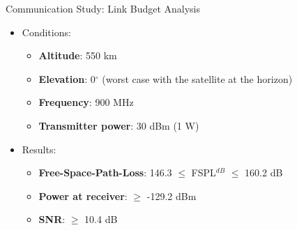 %
%

\begin{frame}{Communication Study: Link Budget Analysis}

    \begin{itemize}
        \item Conditions:
            \begin{itemize}
                \item \textbf{Altitude}: 550 km
                \vspace{0.1cm}
                \item \textbf{Elevation}: 0$^{\circ}$ (worst case with the satellite at the horizon)
                \vspace{0.1cm}
                \item \textbf{Frequency}: 900 MHz
                \vspace{0.1cm}
                \item \textbf{Transmitter power}: 30 dBm (1 W)
            \end{itemize}
        \item Results:
            \begin{itemize}
                \item \textbf{Free-Space-Path-Loss}: 146.3 $\leq$ FSPL$^{dB}$ $\leq$ 160.2 dB
                \vspace{0.1cm}
                \item \textbf{Power at receiver}: $\geq$ -129.2 dBm
                \vspace{0.1cm}
                \item \textbf{SNR}: $\geq$ 10.4 dB
            \end{itemize}
    \end{itemize}

\end{frame}

